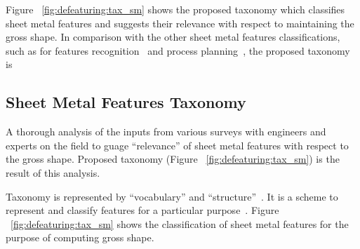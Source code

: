 Figure ~\ref{fig:defeaturing:tax_sm} shows the proposed taxonomy which classifies sheet metal features and suggests their relevance with respect to maintaining the gross shape. In comparison with the other sheet metal features classifications, such as for features recognition~\cite{Gupta2013, Gupta2013a} and process planning~\cite{Kannan2009}, the proposed taxonomy is 
%
%
\subsection{Sheet Metal Features Taxonomy}\label{sec:defeaturing:phase11}

A thorough analysis of the inputs from various surveys with engineers and experts on the field to guage ``relevance'' of sheet metal features with respect to the gross shape.  Proposed  taxonomy (Figure ~\ref{fig:defeaturing:tax_sm}) is the result of this analysis.

Taxonomy is represented by ``vocabulary'' and ``structure''~\cite{Tessier2011}. It is a scheme to represent and classify features for a particular purpose~\cite{Dartigues2005}.  Figure ~\ref{fig:defeaturing:tax_sm} shows the classification of sheet metal features for the purpose of computing gross shape.



